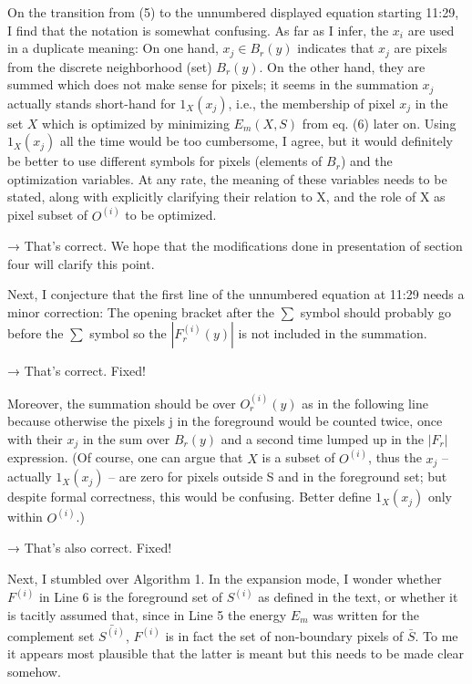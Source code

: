 \documentclass[12pt]{article}
\begin{document}
On the transition from (5) to the unnumbered displayed equation starting 11:29, I find that the notation is somewhat confusing. As far as I infer, the $x_i$ are used in a duplicate meaning: On one hand, $x_j\in B_r(y)$ indicates that $x_j$ are pixels from the discrete neighborhood (set) $B_r(y)$. On the other hand, they are summed which does not make sense for pixels; it seems in the summation $x_j$ actually stands short-hand for $1_X(x_j)$, i.e., the membership of pixel $x_j$ in the set $X$ which is optimized by minimizing $E_m(X,S)$ from eq. (6) later on. Using $1_X(x_j)$ all the time would be too cumbersome, I agree, but it would definitely be better to use different symbols for pixels (elements of $B_r$) and the optimization variables. At any rate, the meaning of these variables needs to be stated, along with explicitly clarifying their relation to X, and the role of X as pixel subset of $O^{(i)}$ to be optimized.

→ That's correct. We hope that the modifications done in presentation of section four will clarify this point.



Next, I conjecture that the first line of the unnumbered equation at 11:29
needs a minor correction: The opening bracket after the $\sum$ symbol should
probably go before the $\sum$ symbol so the $|F_r^{(i)}(y)|$ is not included
in the summation. 

→ That's correct. Fixed!

Moreover, the summation should be over $O_r^{(i)}(y)$ as in the following line because otherwise the pixels j in the foreground would be counted twice, once with their $x_j$ in the sum over $B_r(y)$ and a second time lumped up in the $|F_r|$ expression. (Of course, one can argue that $X$ is a subset of $O^{(i)}$, thus the $x_j$ -- actually $1_X(x_j)$ -- are zero for pixels outside S and in the foreground set; but despite formal correctness, this would be confusing. Better define $1_X(x_j)$ only within $O^{(i)}$.) 

→ That's also correct. Fixed!


Next, I stumbled over Algorithm 1. In the expansion mode, I wonder whether $F^{(i)}$ in Line 6 is the foreground set of $S^{(i)}$ as defined in the text, or whether it is tacitly assumed that, since in Line 5 the energy $E_m$ was written for the complement set $\bar{S^{(i)}}$, $F^{(i)}$ is in fact the set of non-boundary pixels of $\bar{S}$. To me it appears most plausible that the latter is meant but this needs to be made clear somehow.
\end{document}
